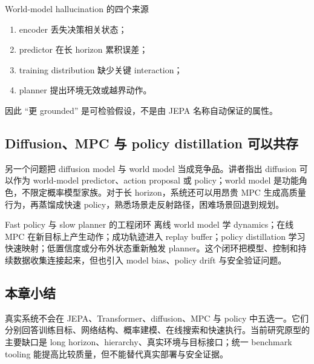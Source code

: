 \begin{warningbox}{World-model hallucination 的四个来源}
\begin{enumerate}
  \item encoder 丢失决策相关状态；
  \item predictor 在长 horizon 累积误差；
  \item training distribution 缺少关键 interaction；
  \item planner 提出环境无效或越界动作。
\end{enumerate}
因此 ``更 grounded'' 是可检验假设，不是由 JEPA 名称自动保证的属性。
\end{warningbox}

\subsection{Diffusion、MPC 与 policy distillation 可以共存}

另一个问题把 diffusion model 与 world model 当成竞争品。讲者指出 diffusion 可以作为 world-model predictor、action proposal 或 policy；world model 是功能角色，不限定概率模型家族。对于长 horizon，系统还可以用昂贵 MPC 生成高质量行为，再蒸馏成快速 policy，熟悉场景走反射路径，困难场景回退到规划。


\begin{importantbox}{Fast policy 与 slow planner 的工程闭环}
离线 world model 学 dynamics；在线 MPC 在新目标上产生动作；成功轨迹进入 replay buffer；policy distillation 学习快速映射；低置信度或分布外状态重新触发 planner。这个闭环把模型、控制和持续数据收集连接起来，但也引入 model bias、policy drift 与安全验证问题。
\end{importantbox}

\subsection{本章小结}

真实系统不会在 JEPA、Transformer、diffusion、MPC 与 policy 中五选一。它们分别回答训练目标、网络结构、概率建模、在线搜索和快速执行。当前研究原型的主要缺口是 long horizon、hierarchy、真实环境与目标接口；统一 benchmark tooling 能提高比较质量，但不能替代真实部署与安全证据。

